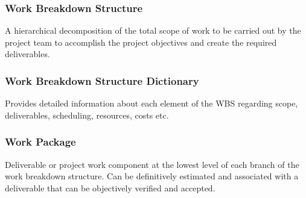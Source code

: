 \documentclass[journal]{IEEEtran}
\begin{document}
\subsubsection{Work Breakdown Structure}
A hierarchical decomposition of the total scope of work to be carried out by the project team to accomplish the project objectives and create the required deliverables.
\subsubsection{Work Breakdown Structure Dictionary}
Provides detailed information about each element of the WBS regarding scope, deliverables, scheduling, resources, costs etc.
\subsubsection{Work Package}
Deliverable or project work component at the lowest level of each
branch of the work breakdown structure. Can be definitively estimated and associated with a deliverable that can be objectively verified and accepted.
\end{document}

